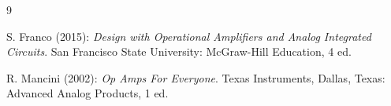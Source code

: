 \begin{thebibliography}{9}

S. Franco (2015): \emph{Design with Operational Amplifiers and Analog Integrated Circuits}. San Francisco
State University: McGraw-Hill Education, 4 ed.

R. Mancini (2002): \emph{Op Amps For Everyone}. Texas Instruments, Dallas, Texas: Advanced
Analog Products, 1 ed.

\end{thebibliography}